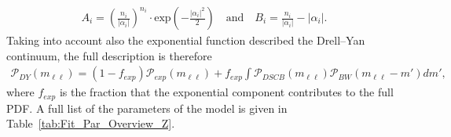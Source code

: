 \begin{eqnarray*}
A_{i} = \left(\frac{n_{i}}{|\alpha_{i}|}\right)^{n_{i}} \cdot \textrm{exp}\left(-\frac{|\alpha_{i}|^2}{2}\right) \quad \textrm{and}\quad B_{i} = \frac{n_{i}}{|\alpha_{i}|}-|\alpha_{i}| .
\end{eqnarray*}
Taking into account also the exponential function described the Drell--Yan continuum, the full description is therefore 
\begin{eqnarray*}
\mathcal{P}_{DY} (m_{\ell\ell}) = (1-f_{exp})\mathcal{P}_{exp}(m_{\ell\ell})+ f_{exp}\int \mathcal{P}_{DSCB}(m_{\ell\ell})\mathcal{P}_{BW}(m_{\ell\ell}-m') dm',
\end{eqnarray*}
where $f_{exp}$ is the fraction that the exponential component contributes to the full PDF. A full list of the parameters of the model is given in Table~\ref{tab:Fit_Par_Overview_Z}.


